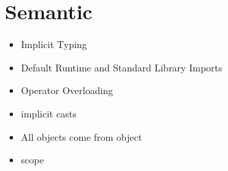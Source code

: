 
\section{Semantic}



\begin{itemize}
\item Implicit Typing
\item Default Runtime and Standard Library Imports
\item Operator Overloading
\item implicit casts
\item All objects come from object
\item scope
\end{itemize}

